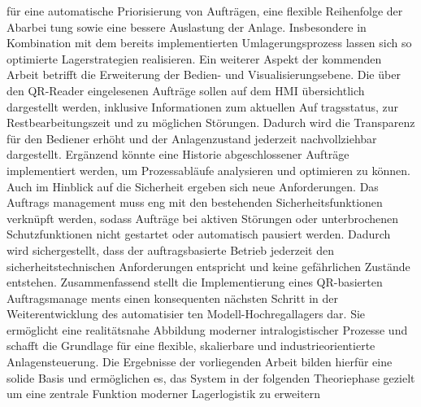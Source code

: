 für eine automatische Priorisierung von Aufträgen, eine flexible Reihenfolge der Abarbei
tung sowie eine bessere Auslastung der Anlage. Insbesondere in Kombination mit dem
bereits implementierten Umlagerungsprozess lassen sich so optimierte Lagerstrategien
realisieren.
Ein weiterer Aspekt der kommenden Arbeit betrifft die Erweiterung der Bedien- und
Visualisierungsebene. Die über den QR-Reader eingelesenen Aufträge sollen auf
dem HMI übersichtlich dargestellt werden, inklusive Informationen zum aktuellen Auf
tragsstatus, zur Restbearbeitungszeit und zu möglichen Störungen. Dadurch wird die
Transparenz für den Bediener erhöht und der Anlagenzustand jederzeit nachvollziehbar
dargestellt. Ergänzend könnte eine Historie abgeschlossener Aufträge implementiert
werden, um Prozessabläufe analysieren und optimieren zu können.
Auch im Hinblick auf die Sicherheit ergeben sich neue Anforderungen. Das Auftrags
management muss eng mit den bestehenden Sicherheitsfunktionen verknüpft werden,
sodass Aufträge bei aktiven Störungen oder unterbrochenen Schutzfunktionen nicht
gestartet oder automatisch pausiert werden. Dadurch wird sichergestellt, dass der
auftragsbasierte Betrieb jederzeit den sicherheitstechnischen Anforderungen entspricht
und keine gefährlichen Zustände entstehen.
Zusammenfassend stellt die Implementierung eines QR-basierten Auftragsmanage
ments einen konsequenten nächsten Schritt in der Weiterentwicklung des automatisier
ten Modell-Hochregallagers dar. Sie ermöglicht eine realitätsnahe Abbildung moderner
intralogistischer Prozesse und schafft die Grundlage für eine flexible, skalierbare und
industrieorientierte Anlagensteuerung. Die Ergebnisse der vorliegenden Arbeit bilden
hierfür eine solide Basis und ermöglichen es, das System in der folgenden Theoriephase
gezielt um eine zentrale Funktion moderner Lagerlogistik zu erweitern

